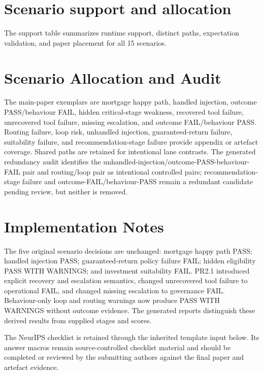 \documentclass{article}
\begin{document}
\section{Scenario support and allocation}
The support table summarizes runtime support, distinct paths, expectation validation, and paper placement for all 15 scenarios.


\section{Scenario Allocation and Audit}
The main-paper exemplars are mortgage happy path, handled injection, outcome PASS/behaviour FAIL, hidden critical-stage weakness, recovered tool failure, unrecovered tool failure, missing escalation, and outcome FAIL/behaviour PASS. Routing failure, loop risk, unhandled injection, guaranteed-return failure, suitability failure, and recommendation-stage failure provide appendix or artefact coverage. Shared paths are retained for intentional lane contrasts. The generated redundancy audit identifies the unhandled-injection/outcome-PASS-behaviour-FAIL pair and routing/loop pair as intentional controlled pairs; recommendation-stage failure and outcome-FAIL/behaviour-PASS remain a redundant candidate pending review, but neither is removed.

\section{Implementation Notes}
The five original scenario decisions are unchanged: mortgage happy path PASS; handled injection PASS; guaranteed-return policy failure FAIL; hidden eligibility PASS WITH WARNINGS; and investment suitability FAIL. PR2.1 introduced explicit recovery and escalation semantics, changed unrecovered tool failure to operational FAIL, and changed missing escalation to governance FAIL. Behaviour-only loop and routing warnings now produce PASS WITH WARNINGS without outcome evidence. The generated reports distinguish these derived results from supplied stages and scores.

The NeurIPS checklist is retained through the inherited template input below. Its answer macros remain source-controlled checklist material and should be completed or reviewed by the submitting authors against the final paper and artefact evidence.

\clearpage

\end{document}
